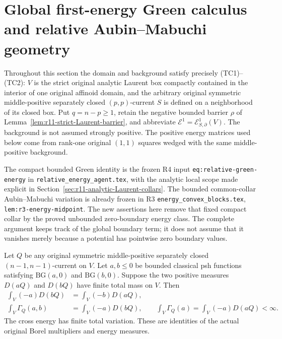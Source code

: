 \section{Global first-energy Green calculus and relative Aubin--Mabuchi geometry}
\label{sec:r11-global-first-energy}

Throughout this section the domain and background satisfy precisely
(TC1)--(TC2): $V$ is the strict original analytic Laurent box compactly
contained in the interior of one original affinoid domain, and the
arbitrary original symmetric middle-positive separately closed
$(p,p)$-current $S$ is defined on a neighborhood of its closed box.
Put $q=n-p\geq1$, retain the negative bounded barrier $\rho$ of
Lemma~\ref{lem:r11-strict-Laurent-barrier}, and abbreviate
$\mathcal E^1=\mathcal E^1_{S,\partial}(V)$.
The background is not assumed strongly positive. The positive energy
matrices used below come from rank-one original $(1,1)$ squares
wedged with the same middle-positive background.

The compact bounded Green identity is the frozen R4 input
\texttt{eq:relative-green-energy} in
\texttt{relative\_energy\_agent.tex}, with the analytic local
scope made explicit in Section~\ref{sec:r11-analytic-Laurent-collars}.
The bounded common-collar Aubin--Mabuchi variation is already frozen
in R3 \texttt{energy\_convex\_blocks.tex},
\texttt{lem:r3-energy-midpoint}. The new assertions here remove that
fixed compact collar by the proved unbounded zero-boundary energy
class. The complete argument keeps track of the global boundary
term; it does not assume that it vanishes merely because a potential
has pointwise zero boundary values.

\begin{lemma}
\label{lem:r11-global-bounded-Green}
Let $Q$ be any original symmetric middle-positive separately closed
$(n-1,n-1)$-current on $V$. Let $a,b\leq0$ be bounded classical
psh functions satisfying $\mathrm{BG}(a,0)$ and
$\mathrm{BG}(b,0)$. Suppose the two positive measures
$D(aQ)$ and $D(bQ)$ have finite total mass on $V$. Then
\[
 \begin{split}
  \int_V(-a)D(bQ)&=\int_V(-b)D(aQ),\\
  \int_V\Gamma_Q(a,b)&=\int_V(-a)D(bQ),\qquad
  \int_V\Gamma_Q(a)=\int_V(-a)D(aQ)<\infty.
 \end{split}
 \tag{GE1}
\]
The cross energy has finite total variation. These are identities
of the actual original Borel multipliers and energy measures.
\end{lemma}

